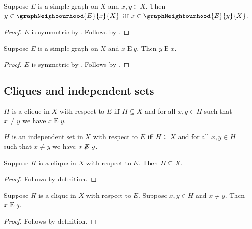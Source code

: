\begin{proposition}\label{simple_graph_neighbourhood_symmetric}
    Suppose $E$ is a simple graph on $X$ and $x,y\in X$.
    Then $y\in\graphNeighbourhood{E}{x}{X}$ iff
        $x\in\graphNeighbourhood{E}{y}{X}$.
\end{proposition}
\begin{proof}
    $E$ is symmetric by .
    Follows by .
\end{proof}

\begin{proposition}\label{simple_graph_edge_symmetric}
    Suppose $E$ is a simple graph on $X$ and $x\mathrel{E}y$.
    Then $y\mathrel{E}x$.
\end{proposition}
\begin{proof}
    $E$ is symmetric by .
    Follows by .
\end{proof}

\subsection{Cliques and independent sets}

\begin{definition}\label{clique_in_graph}
    $H$ is a clique in $X$ with respect to $E$ iff
        $H\subseteq X$ and for all $x,y\in H$ such that $x\neq y$
            we have $x\mathrel{E}y$.
\end{definition}

\begin{definition}\label{independent_in_graph}
    $H$ is an independent set in $X$ with respect to $E$ iff
        $H\subseteq X$ and for all $x,y\in H$ such that $x\neq y$
            we have $x\not\mathrel{E}y$.
\end{definition}

\begin{proposition}\label{clique_subseteq}
    Suppose $H$ is a clique in $X$ with respect to $E$.
    Then $H\subseteq X$.
\end{proposition}
\begin{proof}
    Follows by definition.
\end{proof}

\begin{proposition}\label{clique_edge}
    Suppose $H$ is a clique in $X$ with respect to $E$.
    Suppose $x,y\in H$ and $x\neq y$.
    Then $x\mathrel{E}y$.
\end{proposition}
\begin{proof}
    Follows by definition.
\end{proof}

